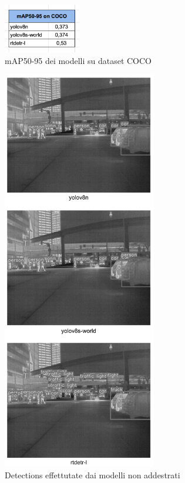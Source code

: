 \begin{figure}[ht]
    \centering
    \includegraphics[width=0.3\textwidth]{files/capitoli/4-sperimentazione-risultati/assets/coco-maps.png}
    \caption{\label{fig:coco-maps}mAP50-95 dei modelli su dataset COCO}
\end{figure}

\clearpage

\begin{figure}[ht]
    \centering
    \includegraphics[width=0.6\textwidth]{files/capitoli/4-sperimentazione-risultati/assets/initial-detections.png}
    \caption{\label{fig:initial-detections}Detections effettutate dai modelli non addestrati}
\end{figure}

\clearpage
